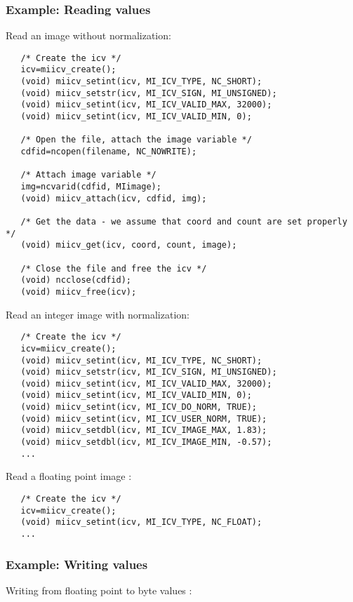 \subsubsection{Example: Reading values}

Read an image without normalization:
\begin{verbatim}
   /* Create the icv */
   icv=miicv_create();
   (void) miicv_setint(icv, MI_ICV_TYPE, NC_SHORT);
   (void) miicv_setstr(icv, MI_ICV_SIGN, MI_UNSIGNED);
   (void) miicv_setint(icv, MI_ICV_VALID_MAX, 32000);
   (void) miicv_setint(icv, MI_ICV_VALID_MIN, 0);

   /* Open the file, attach the image variable */
   cdfid=ncopen(filename, NC_NOWRITE);

   /* Attach image variable */
   img=ncvarid(cdfid, MIimage);
   (void) miicv_attach(icv, cdfid, img);

   /* Get the data - we assume that coord and count are set properly */
   (void) miicv_get(icv, coord, count, image);

   /* Close the file and free the icv */
   (void) ncclose(cdfid);
   (void) miicv_free(icv);
\end{verbatim}

Read an integer image with normalization:
\begin{verbatim}
   /* Create the icv */
   icv=miicv_create();
   (void) miicv_setint(icv, MI_ICV_TYPE, NC_SHORT);
   (void) miicv_setstr(icv, MI_ICV_SIGN, MI_UNSIGNED);
   (void) miicv_setint(icv, MI_ICV_VALID_MAX, 32000);
   (void) miicv_setint(icv, MI_ICV_VALID_MIN, 0);
   (void) miicv_setint(icv, MI_ICV_DO_NORM, TRUE);
   (void) miicv_setint(icv, MI_ICV_USER_NORM, TRUE);
   (void) miicv_setdbl(icv, MI_ICV_IMAGE_MAX, 1.83);
   (void) miicv_setdbl(icv, MI_ICV_IMAGE_MIN, -0.57);
   ...
\end{verbatim}

Read a floating point image :
\begin{verbatim}
   /* Create the icv */
   icv=miicv_create();
   (void) miicv_setint(icv, MI_ICV_TYPE, NC_FLOAT);
   ...
\end{verbatim}

\subsubsection{Example: Writing values}

Writing from floating point to byte values :


